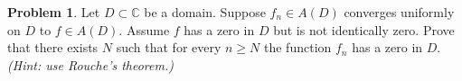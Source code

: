 \documentclass[10pt]{article}
\theoremstyle{definition} %
\newtheorem{problem}{Problem}
\theoremstyle{plain} %
\begin{document}
                            \begin{problem}
                            Let \(D\subset\mathbb{C}\) be a domain.  
                            Suppose \(f_{n}\in A(D)\) converges uniformly on \(D\) to \(f\in A(D)\).  
                            Assume \(f\) has a zero in \(D\) but is not identically zero.  
                            Prove that there exists \(N\) such that for every \(n\ge N\) the function \(f_{n}\) has a zero in \(D\).  
                            \emph{(Hint: use Rouche's theorem.)}
                            \end{problem}
\end{document}
